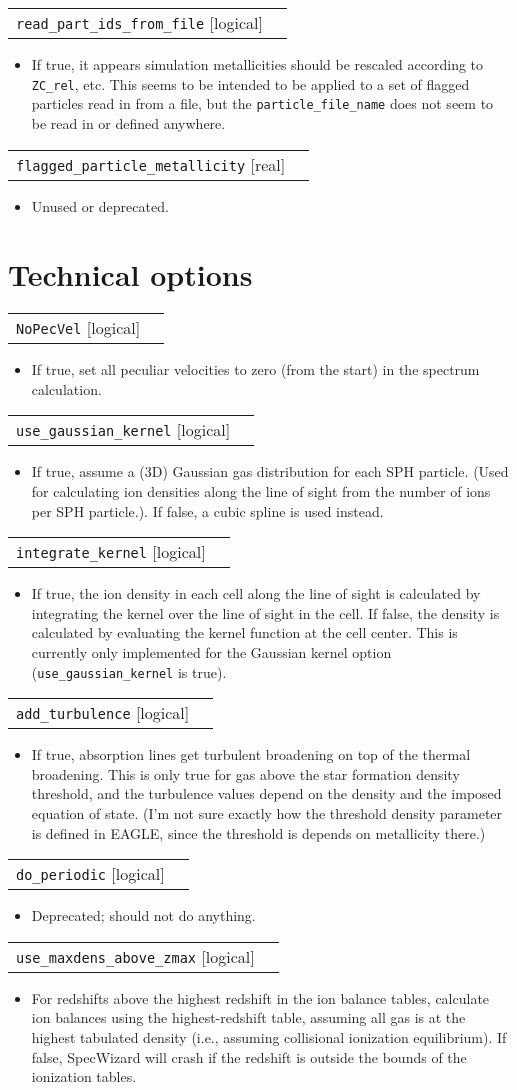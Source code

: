 \documentclass{report}
\makeatletter
\newcommand{\paramdefinition}[3]{
\begin{tabular*}{\textwidth}{l@{\extracolsep{\fill}}r}
		{\tt #1} [{\sc #2}]& #3 \\
\end{tabular*}}
\newcommand{\paramdescription}[1]{
\begin{itemize}
\item #1
\end{itemize}\vspace{0.2cm}}
\newcommand{\param}[1]{{\tt #1}}
\makeatother
\begin{document}
\paramdefinition{read\_part\_ids\_from\_file}{logical}{}
\paramdescription{If true, it appears simulation metallicities should be rescaled according to \param{ZC\_rel}, etc. This seems to be intended to be applied to a set of flagged particles read in from a file, but the \param{particle\_file\_name} does not seem to be read in or defined anywhere.}

\paramdefinition{flagged\_particle\_metallicity}{real}{}
\paramdescription{Unused or deprecated.}



\section{Technical options}

\paramdefinition{NoPecVel}{logical}{}
\paramdescription{If true, set all peculiar velocities to zero (from the start) in the spectrum calculation.}

\paramdefinition{use\_gaussian\_kernel}{logical}{}
\paramdescription{If true, assume a (3D) Gaussian gas distribution for each SPH particle. (Used for calculating ion densities along the line of sight from the number of ions per SPH particle.). If false, a cubic spline is used instead.}

\paramdefinition{integrate\_kernel}{logical}{}
\paramdescription{If true, the ion density in each cell along the line of sight is calculated by integrating the kernel over the line of sight in the cell. If false, the density is calculated by evaluating the kernel function at the cell center. This is currently only implemented for the Gaussian kernel option (\param{use\_gaussian\_kernel} is true).}

\paramdefinition{add\_turbulence}{logical}{}
\paramdescription{If true, absorption lines get turbulent broadening on top of the thermal broadening. This is only true for gas above the star formation density threshold, and the turbulence values depend on the density and the imposed equation of state. (I'm not sure exactly how the threshold density parameter is defined in EAGLE, since the threshold is depends on metallicity there.)}

\paramdefinition{do\_periodic}{logical}{}
\paramdescription{Deprecated; should not do anything.}

\paramdefinition{use\_maxdens\_above\_zmax}{logical}{}
\paramdescription{For redshifts above the highest redshift in the ion balance tables, calculate ion balances using the highest-redshift table, assuming all gas is at the highest tabulated density (i.e., assuming collisional ionization equilibrium). If false, SpecWizard will crash if the redshift is outside the bounds of the ionization tables.}
\end{document}
